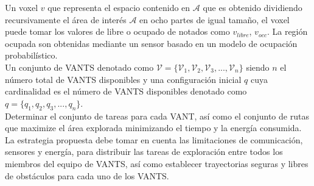 \documentclass[sigconf]{acmart}
\begin{document}
Un voxel $v$ que representa el espacio contenido en $\mathcal{A}$ que es obtenido dividiendo recursivamente el área de interés $\mathcal{A}$ en ocho partes de igual tamaño, el voxel puede tomar los valores de libre o ocupado de notados como $v_{libre}$, $v_{occ}$. La región ocupada son obtenidas mediante un sensor basado en un modelo de ocupación probabilístico.\\

Un conjunto de VANTS denotado como $\mathcal{V} = \{\mathcal{V}_{1},\mathcal{V}_{2},\mathcal{V}_{3},...,\mathcal{V}_{n}\}$ siendo $n$ el número total de VANTS disponibles y una configuración inicial $q$ cuya cardinalidad es el número de VANTS disponibles denotado como $q = \{q_{1},q_{2},q_{3},...,q_{n}\}$.\\

Determinar el conjunto de tareas para cada VANT, así como el conjunto de rutas que maximize el área explorada minimizando el tiempo y la energía consumida.\\


La estrategia propuesta debe tomar en cuenta las limitaciones de comunicación, sensores y energía, para distribuir las tareas de exploración entre todos los miembros del equipo de VANTS, así como establecer trayectorias seguras y libres de obstáculos para cada uno de los VANTS.\\

\end{document}
